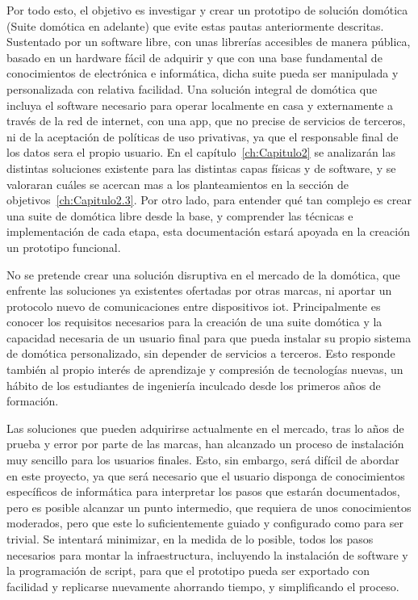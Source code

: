 \vspace{1cm}

Por todo esto, el objetivo es investigar y crear un prototipo de solución domótica (Suite domótica en adelante) que evite estas pautas anteriormente descritas. Sustentado por un software libre, con unas librerías accesibles de manera pública, basado en un hardware fácil de adquirir y que con una base fundamental de conocimientos de electrónica e informática, dicha suite pueda ser manipulada y personalizada con relativa facilidad. Una solución integral de domótica que incluya el software necesario para operar localmente en casa y externamente a través de la red de internet, con una \gls{app}, que no precise de servicios de terceros, ni de la aceptación de políticas de uso privativas, ya que el responsable final de los datos sera el propio usuario. En el capítulo~\ref{ch:Capitulo2} se analizarán las distintas soluciones existente para las distintas capas físicas y de software, y se valoraran cuáles se acercan mas a los planteamientos en la sección de objetivos~\ref{ch:Capitulo2.3}. Por otro lado, para entender qué tan complejo es crear una suite de domótica libre desde la base, y comprender las técnicas e implementación de cada etapa, esta documentación estará apoyada en la creación un prototipo funcional.

\vspace{1cm}

No se pretende crear una solución disruptiva en el mercado de la domótica, que enfrente las soluciones ya existentes ofertadas por otras marcas, ni aportar un protocolo nuevo de comunicaciones entre dispositivos \gls{iot}. Principalmente es conocer los requisitos necesarios para la creación de una suite domótica y la capacidad necesaria de un usuario final para que pueda instalar su propio sistema de domótica personalizado, sin depender de servicios a terceros. Esto responde también al propio interés de aprendizaje y compresión de tecnologías nuevas, un hábito de los estudiantes de ingeniería inculcado desde los primeros años de formación.

\vspace{1cm}

Las soluciones que pueden adquirirse actualmente en el mercado, tras lo años de prueba y error por parte de las marcas, han alcanzado un proceso de instalación muy sencillo para los usuarios finales. Esto, sin embargo, será difícil de abordar en este proyecto, ya que será necesario que el usuario disponga de conocimientos específicos de informática para interpretar los pasos que estarán documentados, pero es posible alcanzar un punto intermedio, que requiera de unos conocimientos moderados, pero que este lo suficientemente guiado y configurado como para ser trivial. Se intentará minimizar, en la medida de lo posible, todos los pasos necesarios para montar la infraestructura, incluyendo la instalación de software y la programación de \gls{script}, para que el prototipo pueda ser exportado con facilidad y replicarse nuevamente ahorrando tiempo, y simplificando el proceso.

